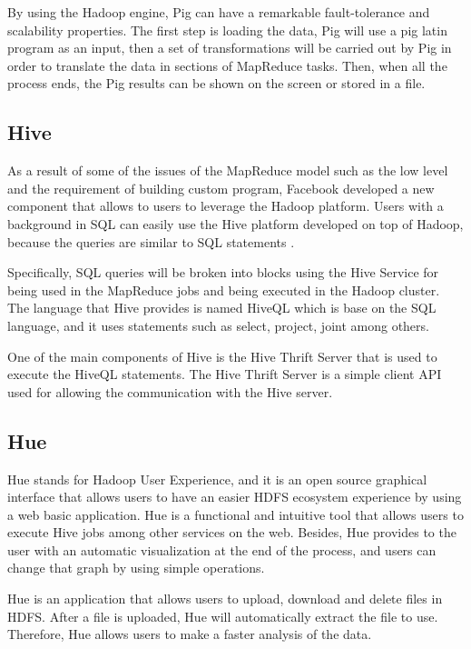 By using the Hadoop engine, Pig can have a remarkable fault-tolerance and scalability properties. The first step is loading the data, Pig will use a pig latin program as an input, then a set of transformations will be carried out by Pig in order to translate the data in sections of MapReduce tasks. Then, when all the process ends, the Pig results can be shown on the screen or stored in a file.
 
\subsection{Hive}

As a result of some of the issues of the MapReduce model such as the low level and the requirement of building custom program, Facebook developed a new component that allows to users to leverage the Hadoop platform. Users with a background in SQL can easily use the Hive platform developed on top of Hadoop, because the queries are similar to SQL statements \cite{thusoo2009hive}. 

Specifically, SQL queries will be broken into blocks using the Hive Service for being used in the MapReduce jobs and being executed in the Hadoop cluster. The language that Hive provides is named HiveQL which is base on the SQL language, and it uses statements such as select, project, joint among others.

One of the main components of Hive is the Hive Thrift Server that is used to execute the HiveQL statements. The Hive Thrift Server is a simple client API used for allowing the communication with the Hive server.
  
\subsection{Hue}

Hue \cite{rasheed2013fedora} stands for Hadoop User Experience, and it is an open source graphical interface that allows users to have an
easier HDFS ecosystem experience by using a web basic application. Hue is a functional and intuitive tool that allows users to execute Hive jobs among other services on the web. Besides, Hue provides to the user with an automatic visualization at the end of the process, and users can change that graph by using simple operations.

Hue \cite{b2016professionalhadoop} is an application that allows users to upload, download and delete files in HDFS. After a file is uploaded, Hue will automatically extract the file to use. Therefore, Hue allows users to make a faster analysis of the data.

